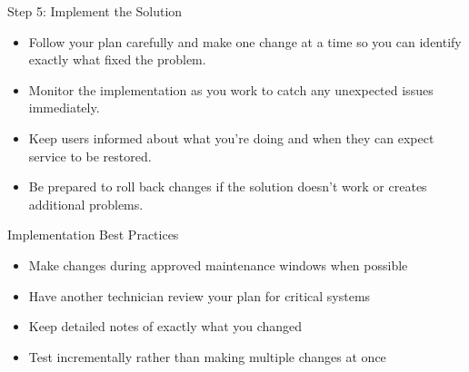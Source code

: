 \documentclass[aspectratio=169]{beamer}
\begin{document}
\begin{frame}{Step 5: Implement the Solution}

\begin{itemize}
    \item Follow your plan carefully and make one change at a time so you can identify exactly what fixed the problem.
    \item Monitor the implementation as you work to catch any unexpected issues immediately.
    \item Keep users informed about what you're doing and when they can expect service to be restored.
    \item Be prepared to roll back changes if the solution doesn't work or creates additional problems.
\end{itemize}

\vspace{0.3cm}

\begin{block}{Implementation Best Practices}
\begin{itemize}
    \item Make changes during approved maintenance windows when possible
    \item Have another technician review your plan for critical systems
    \item Keep detailed notes of exactly what you changed
    \item Test incrementally rather than making multiple changes at once
\end{itemize}
\end{block}

\end{frame}
\end{document}
